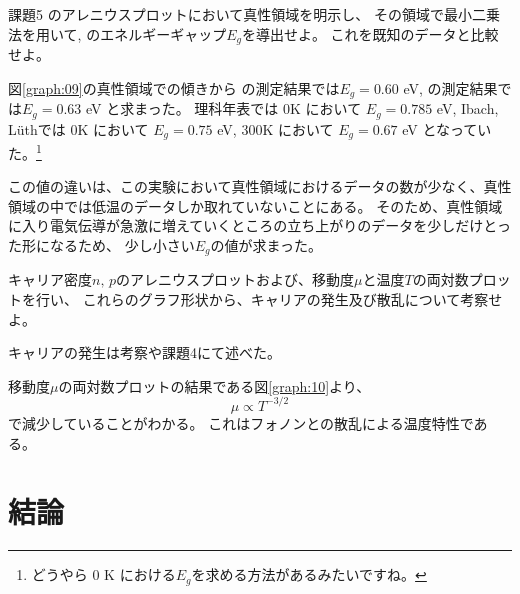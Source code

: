 \documentclass[11pt,dvipdfmx,a4paper]{jsarticle}
\numberwithin{equation}{section}
\begin{document}
\begin{tcolorbox}[title=課題6]
	課題5 のアレニウスプロットにおいて真性領域を明示し、
	その領域で最小二乗法を用いて,  のエネルギーギャップ\(E_g\)を導出せよ。
	これを既知のデータと比較せよ。
\end{tcolorbox}
図\ref{graph:09}の真性領域での傾きから
の測定結果では\(E_g = 0.60\) eV,
の測定結果では\(E_g = 0.63\) eV と求まった。
理科年表\cite{rikanenpyo}では 0K において \(E_g = 0.785\) eV,
Ibach, L\"uth\cite{ibach-luth}では 0K において \(E_g = 0.75\) eV, 300K において \(E_g = 0.67\) eV
となっていた。\footnote{どうやら 0 K における\(E_g\)を求める方法があるみたいですね。}

この値の違いは、この実験において真性領域におけるデータの数が少なく、真性領域の中では低温のデータしか取れていないことにある。
そのため、真性領域に入り電気伝導が急激に増えていくところの立ち上がりのデータを少しだけとった形になるため、
少し小さい\(E_g\)の値が求まった。\\

\begin{tcolorbox}[title=課題7]
	キャリア密度\(n,\,p\)のアレニウスプロットおよび、移動度\(\mu\)と温度\(T\)の両対数プロットを行い、
	これらのグラフ形状から、キャリアの発生及び散乱について考察せよ。
\end{tcolorbox}
キャリアの発生は考察や課題4にて述べた。

移動度\(\mu\)の両対数プロットの結果である図\ref{graph:10}より、
\begin{equation}
	\mu \propto T^{-3/2}
\end{equation}
で減少していることがわかる。
これはフォノンとの散乱による温度特性である\cite{ibach-luth}。

\section{結論}




\end{document}
